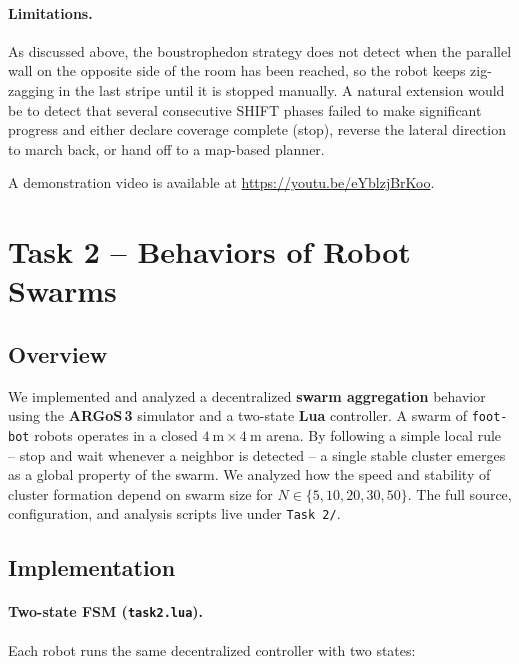 \documentclass[12pt, a4paper]{article}
\begin{document}
\paragraph{Limitations.}
As discussed above, the boustrophedon strategy does not detect when the
parallel wall on the opposite side of the room has been reached, so the robot
keeps zig-zagging in the last stripe until it is stopped manually.  A natural
extension would be to detect that several consecutive SHIFT phases failed to
make significant progress and either declare coverage complete (stop), reverse
the lateral direction to march back, or hand off to a map-based planner.

A demonstration video is available at
\url{https://youtu.be/eYblzjBrKoo}.

\newpage
\section{Task 2 -- Behaviors of Robot Swarms}

\subsection{Overview}

We implemented and analyzed a decentralized \textbf{swarm aggregation}
behavior using the \textbf{ARGoS\,3} simulator and a two-state \textbf{Lua}
controller.  A swarm of \texttt{foot-bot} robots operates in a closed
$4~\text{m} \times 4~\text{m}$ arena.  By following a simple local rule -- stop
and wait whenever a neighbor is detected -- a single stable cluster emerges as
a global property of the swarm.  We analyzed how the speed and stability of
cluster formation depend on swarm size for
$N \in \{5, 10, 20, 30, 50\}$.  The full source, configuration, and analysis
scripts live under \texttt{Task~2/}.

\subsection{Implementation}

\paragraph{Two-state FSM (\texttt{task2.lua}).}
Each robot runs the same decentralized controller with two states:
\end{document}
